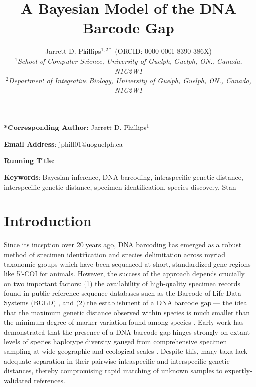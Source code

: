 \documentclass[12pt]{article}
\makeatletter
\renewcommand{\maketitle}{\bgroup\setlength{\parindent}{0pt}
\begin{flushleft}
\textbf{\@title}

  \@author
\end{flushleft}\egroup
}
\makeatother
\begin{document}
\linenumbers

\title{A Bayesian Model of the DNA Barcode Gap}

\author{Jarrett D. Phillips$^{1, 2*}$ (ORCID: 0000-0001-8390-386X)  \\
\textit{$^1$School of Computer Science, University of Guelph, Guelph, ON., Canada, N1G2W1} \\ \textit{$^2$Department of Integrative Biology, University of Guelph, Guelph, ON., Canada, N1G2W1} }

\date{}

\maketitle

\vspace{2mm}

\noindent \textbf{*Corresponding Author}: Jarrett D. Phillips$^{1}$

\noindent \textbf{Email Address}: jphill01@uoguelph.ca

\noindent \textbf{Running Title}: 

\newpage

\begin{abstract}

\end{abstract}

\textbf{Keywords}: Bayesian inference, DNA barcoding, intraspecific genetic distance, \\ interspecific genetic distance, specimen identification, species discovery, Stan 

\vspace{2mm}

\section{Introduction}

Since its inception over 20 years ago, DNA barcoding \citep{hebert2003biological, hebert2003barcoding} has emerged as a robust method of specimen identification and species delimitation across myriad \\ taxonomic groups which have been sequenced at short, standardized gene regions like 5'-COI for animals. However, the success of the approach depends crucially on two important factors: (1) the availability of high-quality specimen records found in public reference sequence databases such as the Barcode of Life Data Systems (BOLD) \citep{ratnasingham2007bold}, and (2) the establishment of a DNA barcode gap --- the idea that the maximum genetic distance observed within species is much smaller than the minimum degree of marker variation found among species \citep{meyer2005dna, meier2008use}. Early work has demonstrated that the presence of a DNA barcode gap hinges strongly on extant levels of species haplotype diversity gauged from comprehensive specimen sampling at wide geographic and ecological scales \citep{bergsten2012effect}. Despite this, many taxa lack adequate separation in their pairwise intraspecific and interspecific genetic distances, thereby compromising rapid matching of unknown samples to expertly-validated references.
\end{document}
